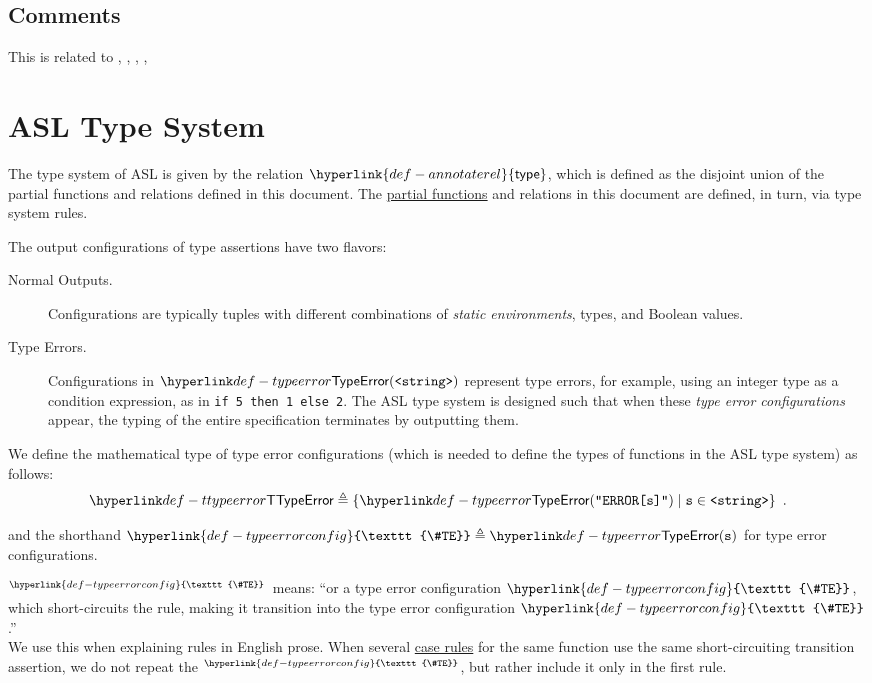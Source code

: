 \documentclass{book}
\newcommand\TypeErrorConfig[0]{\hyperlink{def-typeerrorconfig}{\texttt{\#TE}}}
\newcommand\ProseOrTypeError[0]{\hyperlink{def-proseortypeerror}{$^{\TypeErrorConfig}$}}
\newcommand\annotaterel[0]{\hyperlink{def-annotaterel}{\textsf{type}}}
\newcommand\vs[0]{\texttt{s}}
\begin{document}
\subsection{Comments}
    This is related to , , , , 

\section{ASL Type System}
\hypertarget{def-annotaterel}{}
The type system of ASL is given by the relation $\annotaterel$, which is defined as the disjoint union
of the partial functions and relations defined in this document.
The \hyperlink{def-partialfunc}{partial functions} and relations in this document are defined, in turn, via type system rules.

The output configurations of type assertions have two flavors:
\begin{description}
  \item[Normal Outputs.] \hypertarget{def-normal-type-outputs}{}
  Configurations are typically tuples with different combinations
  of \emph{static environments}, types, and Boolean values.

  \hypertarget{def-typeerror}{}
  \item[Type Errors.] Configurations in $\TypeError(\texttt{<string>})$
  represent type errors, for example, using an integer type as a condition expression, as in \verb|if 5 then 1 else 2|.
  The ASL type system is designed such that when these \emph{type error configurations} appear,
  the typing of the entire specification terminates by outputting them.
\end{description}

We define the mathematical type of type error configurations
(which is needed to define the types of functions in the ASL type system)
as follows:
\hypertarget{def-ttypeerror}{}
\[
  \TTypeError \triangleq \{\TypeErrorVal{\vs} \;|\; \vs \in \texttt{<string>} \} \enspace.
\]

\hypertarget{def-typeerrorconfig}{}
and the shorthand $\TypeErrorConfig \triangleq \TypeError(\vs)$ for type error configurations.

\hypertarget{def-proseortypeerror}{}
\ProseOrTypeError\ means: ``or a type error configuration $\TypeErrorConfig$, which short-circuits the rule,
making it transition into the type error configuration $\TypeErrorConfig$.''\\
We use this when explaining rules in English prose.
%
When several \hyperlink{def-caserules}{case rules} for the same function use the same short-circuiting transition assertion,
we do not repeat the \ProseOrTypeError, but rather include it only in the first rule.
\end{document}
